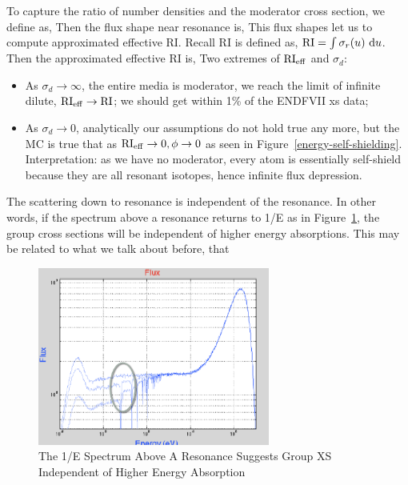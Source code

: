 \documentclass{school-22.211-notes}
\begin{document}
To capture the ratio of number densities and the moderator cross section, we define  as,
Then the flux shape near resonance is,
This flux shapes let us to compute approximated effective RI. Recall RI is defined as, $\mathrm{RI} = \int \sigma_r (u) \mbox{ }\mathrm{d} u$. Then the approximated effective RI is,
Two extremes of $\mathrm{RI}_{\mathrm{eff}}$ and $\sigma_d$:
\begin{itemize}
\item As $\sigma_d \to \infty$, the entire media is moderator, we reach the limit of infinite dilute, $\mathrm{RI}_{\mathrm{eff}} \to \mathrm{RI}$; we should get within 1\% of the ENDFVII xs data;
\item As $\sigma_d \to 0$, analytically our assumptions do not hold true any more, but the MC is true that as $\mathrm{RI}_{\mathrm{eff}} \to 0, \phi \to 0$ as seen in Figure~\ref{energy-self-shielding}. Interpretation: as we have no moderator, every atom is essentially self-shield because they are all resonant isotopes, hence infinite flux depression.  
\end{itemize}
The scattering down to resonance is independent of the resonance. In other words, if the spectrum above a resonance returns to 1/E as in Figure~\ref{1overE}, the group cross sections will be independent of higher energy absorptions. This may be related to what we talk about before, that 
\begin{figure}
  \centering
  \includegraphics[width=3in]{images/r-m/resonance-1-over-E.png}
  \caption{The 1/E Spectrum Above A Resonance Suggests Group XS Independent of Higher Energy Absorption} \label{1overE}
\end{figure}
\end{document}
